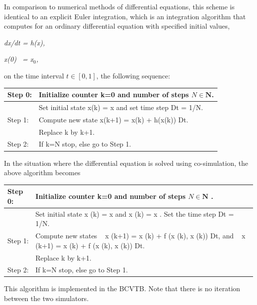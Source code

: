 In comparison to numerical methods of differential equations, this scheme is identical to an explicit Euler integration, which is an integration algorithm that computes for an ordinary differential equation with specified initial values,

\emph{dx/dt = h(x),}

\emph{x(0)~ = x\(_{0}\),}

on the time interval \(t \in [0,1]\), the following sequence:

\begin{longtable}[c]{p{1.5in}p{4.5in}}

\toprule
Step 0: & Initialize counter k=0 and number of steps \(N \in \mathbf{N}\). \tabularnewline
\endhead

~ & Set initial state x(k) = x and set time step Dt = 1/N. \tabularnewline
Step 1: & Compute new state x(k+1) = x(k) + h(x(k)) Dt. \tabularnewline
~ & Replace k by k+1. \tabularnewline
Step 2: & If k=N stop, else go to Step 1. \tabularnewline
\bottomrule
\end{longtable}

In the situation where the differential equation is solved using co-simulation, the above algorithm becomes

\begin{longtable}[c]{p{1.5in}p{4.5in}}

\toprule
Step 0: & Initialize counter k=0 and number of steps $N \in \mathbf{N}$ . \tabularnewline
\endhead

~ & Set initial state x  (k) = x   and x  (k) = x  . Set the time step Dt = 1/N. \tabularnewline
Step 1: & Compute new states ~ x  (k+1) = x  (k) + f  (x  (k), x  (k)) Dt, and ~ x  (k+1) = x  (k) + f  (x  (k), x  (k)) Dt. \tabularnewline
~ & Replace k by k+1. \tabularnewline
Step 2: & If k=N stop, else go to Step 1. \tabularnewline
\bottomrule
\end{longtable}

This algorithm is implemented in the BCVTB. Note that there is no iteration between the two simulators.
